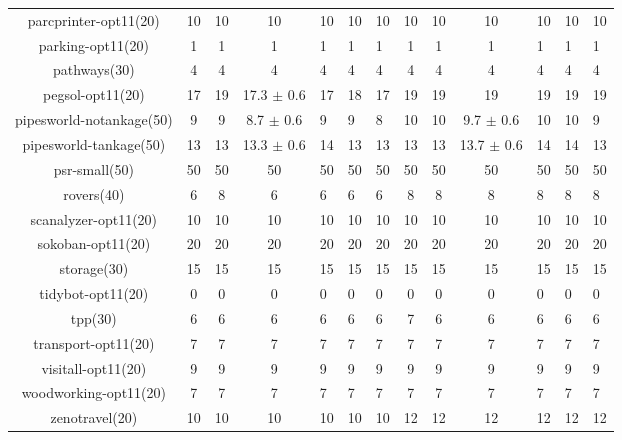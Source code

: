 \begin{center}
\begin{tabular}{|c|cccHHH|cccHHH|}
parcprinter-opt11(20) & 10 & 10 & 10 & 10 & 10 & 10 & 10 & 10 & 10 & 10 & 10 & 10\\
parking-opt11(20) & 1 & 1 & 1 & 1 & 1 & 1 & 1 & 1 & 1 & 1 & 1 & 1\\
pathways(30) & 4 & 4 & 4 & 4 & 4 & 4 & 4 & 4 & 4 & 4 & 4 & 4\\
pegsol-opt11(20) & 17 & 19 & 17.3 \(\pm\) 0.6 & 17 & 18 & 17 & 19 & 19 & 19 & 19 & 19 & 19\\
pipesworld-notankage(50) & 9 & 9 & 8.7 \(\pm\) 0.6 & 9 & 9 & 8 & 10 & 10 & 9.7 \(\pm\) 0.6 & 10 & 10 & 9\\
pipesworld-tankage(50) & 13 & 13 & 13.3 \(\pm\) 0.6 & 14 & 13 & 13 & 13 & 13 & 13.7 \(\pm\) 0.6 & 14 & 14 & 13\\
psr-small(50) & 50 & 50 & 50 & 50 & 50 & 50 & 50 & 50 & 50 & 50 & 50 & 50\\
rovers(40) & 6 & 8 & 6 & 6 & 6 & 6 & 8 & 8 & 8 & 8 & 8 & 8\\
scanalyzer-opt11(20) & 10 & 10 & 10 & 10 & 10 & 10 & 10 & 10 & 10 & 10 & 10 & 10\\
sokoban-opt11(20) & 20 & 20 & 20 & 20 & 20 & 20 & 20 & 20 & 20 & 20 & 20 & 20\\
storage(30) & 15 & 15 & 15 & 15 & 15 & 15 & 15 & 15 & 15 & 15 & 15 & 15\\
tidybot-opt11(20) & 0 & 0 & 0 & 0 & 0 & 0 & 0 & 0 & 0 & 0 & 0 & 0\\
tpp(30) & 6 & 6 & 6 & 6 & 6 & 6 & 7 & 6 & 6 & 6 & 6 & 6\\
transport-opt11(20) & 7 & 7 & 7 & 7 & 7 & 7 & 7 & 7 & 7 & 7 & 7 & 7\\
visitall-opt11(20) & 9 & 9 & 9 & 9 & 9 & 9 & 9 & 9 & 9 & 9 & 9 & 9\\
woodworking-opt11(20) & 7 & 7 & 7 & 7 & 7 & 7 & 7 & 7 & 7 & 7 & 7 & 7\\
zenotravel(20) & 10 & 10 & 10 & 10 & 10 & 10 & 12 & 12 & 12 & 12 & 12 & 12\\
\hline
\end{tabular}
\end{center}
